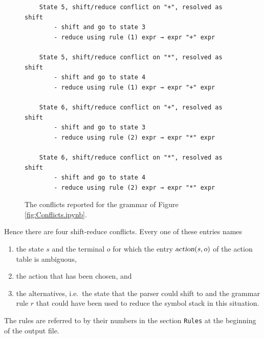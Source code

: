 \begin{figure}[!ht]
\centering
\begin{verbatim}
    State 5, shift/reduce conflict on "+", resolved as shift
        - shift and go to state 3
        - reduce using rule (1) expr → expr "+" expr

    State 5, shift/reduce conflict on "*", resolved as shift
        - shift and go to state 4
        - reduce using rule (1) expr → expr "+" expr

    State 6, shift/reduce conflict on "+", resolved as shift
        - shift and go to state 3
        - reduce using rule (2) expr → expr "*" expr

    State 6, shift/reduce conflict on "*", resolved as shift
        - shift and go to state 4
        - reduce using rule (2) expr → expr "*" expr
\end{verbatim}
\vspace*{-0.3cm}
\caption{The conflicts reported for the grammar of Figure \ref{fig:Conflicts.ipynb}.}
\label{fig:Conflicts.warnings}
\end{figure}
\FloatBarrier

\noindent
Hence there are four shift-reduce conflicts.  Every one of these entries names
\begin{enumerate}
\item the state $s$ and the terminal $o$ for which the entry $\textsl{action}(s,o)$ of the action table is
      ambiguous,
\item the action that has been chosen, and
\item the alternatives, i.e.~the state that the parser could shift to and the grammar rule $r$ that could have
      been used to reduce the symbol stack in this situation.
\end{enumerate}
The rules are referred to by their numbers in the section \texttt{Rules} at the beginning of the output file.

